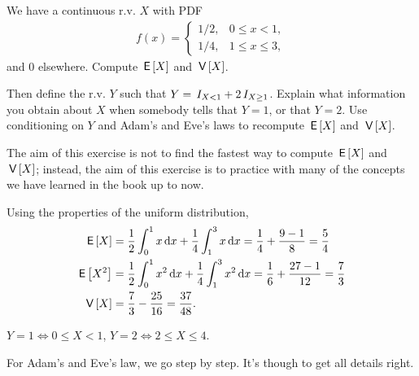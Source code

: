 \begin{exercise}
We have a continuous r.v. $X$ with PDF
\begin{align}
  \label{eq:1123}
  f(x) =
  \begin{cases}
    1/2, & 0\leq x < 1, \\
    1/4, & 1\leq x \leq 3,
  \end{cases}
\end{align}
and $0$ elsewhere. Compute $\,\mathsf{E}\left[X\right]$ and $\,\mathsf{V}\left[X\right]$.

Then define the r.v.
$Y$ such that $Y=\,I_{X< 1} + 2\,I_{X\geq 1}$.
Explain what information you obtain about $X$ when somebody tells that $Y=1$, or that $Y=2$.
Use conditioning on $Y$ and Adam's and Eve's laws to recompute $\,\mathsf{E}\left[X\right]$ and $\,\mathsf{V}\left[X\right]$.

The aim of this exercise is not to find the fastest way to compute $\,\mathsf{E}\left[X\right]$ and $\,\mathsf{V}\left[X\right]$; instead, the aim of this exercise is to practice with many of the concepts we have learned in the book up to now.

\begin{solution}
Using the properties of the uniform distribution,
\begin{align}
\,\mathsf{E}\left[X\right] &= \frac{1}{2} \int_0^1 x \,\textrm{d}x + \frac{1}{4} \int_1^3 x \,\textrm{d}x = \frac{1}{4} + \frac{9-1}{8} = \frac{5}{4} \\
\,\mathsf{E}\left[X^2\right] &=  \frac{1}{2}\int_0^{1} x^{2}\,\textrm{d}x + \frac{1}{4}\int_1^{3} x^{2}\,\textrm{d}x = \frac{1}{6} + \frac{27-1}{12} = \frac{7}{3} \\
\,\mathsf{V}\left[X\right] &=  \frac{7}{3} - \frac{25}{16} = \frac{37}{48}.
\end{align}

$Y=1 \iff 0\leq X< 1$,  $Y=2 \iff 2\leq X \leq 4$.

For Adam's and Eve's law, we go step by step. It's though to get all details right.


\end{solution}
\end{exercise}
